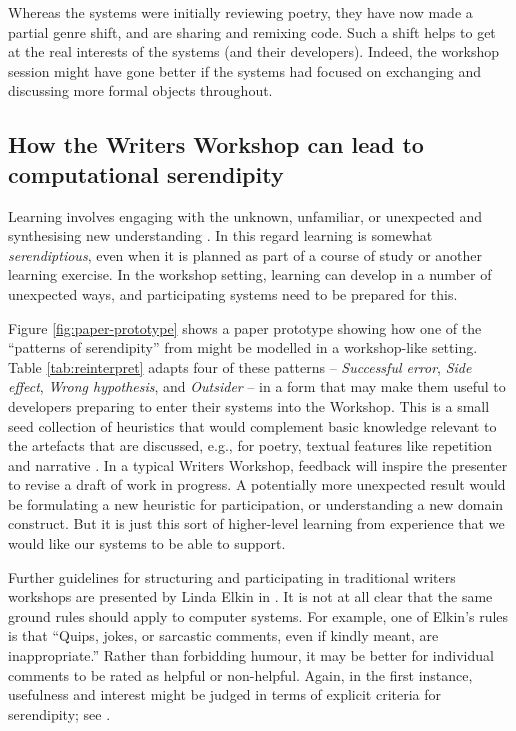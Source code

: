 Whereas the systems were initially reviewing poetry, they have now
made a partial genre shift, and are sharing and remixing code.  Such a
shift helps to get at the real interests of the systems (and their
developers).  Indeed, the workshop session might have gone better if
the systems had focused on exchanging and discussing more formal
objects throughout.



\subsection{How the Writers Workshop can lead to computational serendipity}

Learning involves engaging with the unknown, unfamiliar, or unexpected
and synthesising new understanding \cite{deleuze1994difference}.  In
this regard learning is somewhat \emph{serendiptious}, even when it is
planned as part of a course of study or another learning exercise.  In the
workshop setting, learning can develop in a number of unexpected
ways, and participating systems need to be prepared for this.

Figure \ref{fig:paper-prototype} shows a paper prototype showing how
one of the ``patterns of serendipity'' from  might be
modelled in a workshop-like setting.  Table \ref{tab:reinterpret}
adapts four of these patterns -- \emph{Successful error}, \emph{Side
  effect}, \emph{Wrong hypothesis}, and \emph{Outsider} -- in a form
that may make them useful to developers preparing to enter their
systems into the Workshop.  This is a small seed collection of
heuristics that would complement basic knowledge relevant to the
artefacts that are discussed, e.g., for poetry, textual features like
repetition and narrative \cite{corneli15iccc}.  In a typical Writers
Workshop, feedback will inspire the presenter to revise a draft of
work in progress.  A potentially more unexpected result would be
formulating a new heuristic for participation, or understanding a new
domain construct.  But it is just this sort of higher-level learning
from experience that we would like our systems to be able to support.


Further guidelines for structuring and participating in traditional
writers workshops are presented by Linda Elkin in
\cite[pp. 201--203]{gabriel2002writer}.  It is not at all clear that
the same ground rules should apply to computer systems.  For example,
one of Elkin's rules is that ``Quips, jokes, or sarcastic comments,
even if kindly meant, are inappropriate.''  Rather than forbidding
humour, it may be better for individual comments to be rated as
helpful or non-helpful.  Again, in the first instance, usefulness
and interest might be judged in terms of explicit criteria for serendipity;
see \cite{corneli15cc,pease2013discussion}.

